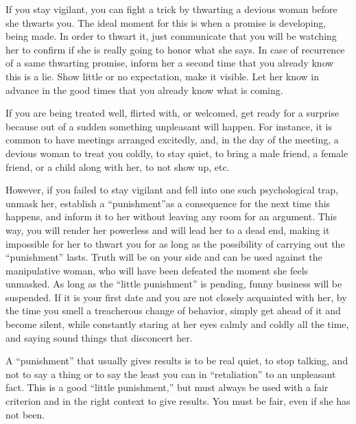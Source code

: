 \par If you stay vigilant, you can fight a trick by thwarting a devious woman before she thwarts you. The ideal moment for this is when a promise is developing, being made. In order to thwart it, just communicate that you will be watching her to confirm if she is really going to honor what she says. In case of recurrence of a same thwarting promise, inform her a second time that you already know this is a lie. Show little or no expectation, make it visible. Let her know in advance in the good times that you already know what is coming.

\par If you are being treated well, flirted with, or welcomed, get ready for a surprise because out of a sudden something unpleasant will happen. For instance, it is common to have meetings arranged excitedly, and, in the day of the meeting, a devious woman to treat you coldly, to stay quiet, to bring a male friend, a female friend, or a child along with her, to not show up, etc.

\par However, if you failed to stay vigilant and fell into one such psychological trap, unmask her, establish a \enquote{punishment}\footnotemark[13] as a consequence for the next time this happens, and inform it to her without leaving any room for an argument. This way, you will render her powerless and will lead her to a dead end, making it impossible for her to thwart you for as long as the possibility of carrying out the \enquote{punishment} lasts. Truth will be on your side and can be used against the manipulative woman, who will have been defeated the moment she feels unmasked. As long as the \enquote{little punishment} is pending, funny business will be suspended. If it is your first date and you are not closely acquainted with her, by the time you smell a treacherous change of behavior, simply get ahead of it and become silent, while constantly staring at her eyes calmly and coldly all the time, and saying sound things that disconcert her.


\par A \enquote{punishment} that usually gives results is to be real quiet, to stop talking, and not to say a thing or to say the least you can in \enquote{retaliation} to an unpleasant fact. This is a good \enquote{little punishment,} but must always be used with a fair criterion and in the right context to give results. You must be fair, even if she has not been.

